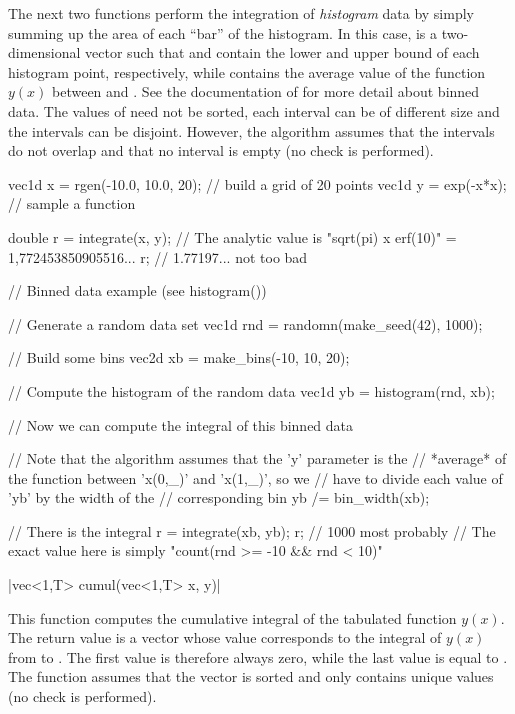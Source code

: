 The next two functions perform the integration of \emph{histogram} data by simply summing up the area of each ``bar'' of the histogram. In this case,  is a two-dimensional vector such that  and  contain the lower and upper bound of each histogram point, respectively, while  contains the average value of the function $y(x)$ between  and . See the documentation of  for more detail about binned data. The values of  need not be sorted, each interval can be of different size and the intervals can be disjoint. However, the algorithm assumes that the intervals do not overlap and that no interval is empty (no check is performed).

\begin{example}
\begin{cppcode}
vec1d x = rgen(-10.0, 10.0, 20); // build a grid of 20 points
vec1d y = exp(-x*x);             // sample a function

double r = integrate(x, y);
// The analytic value is "sqrt(pi) x erf(10)" = 1,772453850905516...
r; // 1.77197... not too bad

// Binned data example (see histogram())

// Generate a random data set
vec1d rnd = randomn(make_seed(42), 1000);

// Build some bins
vec2d xb = make_bins(-10, 10, 20);

// Compute the histogram of the random data
vec1d yb = histogram(rnd, xb);

// Now we can compute the integral of this binned data

// Note that the algorithm assumes that the 'y' parameter is the
// *average* of the function between 'x(0,_)' and 'x(1,_)', so we
// have to divide each value of 'yb' by the width of the
// corresponding bin
yb /= bin_width(xb);

// There is the integral
r = integrate(xb, yb);
r; // 1000 most probably
// The exact value here is simply "count(rnd >= -10 && rnd < 10)"
\end{cppcode}
\end{example}


\funcitem \cppinline|vec<1,T> cumul(vec<1,T> x, y)| 

This function computes the cumulative integral of the tabulated function $y(x)$. The return value is a vector whose value  corresponds to the integral of $y(x)$ from  to . The first value is therefore always zero, while the last value is equal to . The function assumes that the vector  is sorted and only contains unique values (no check is performed).

